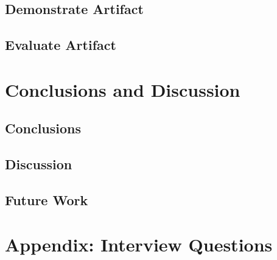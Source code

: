 \documentclass[12pt, a4, oneside, openright]{book}
\begin{document}
    \section{Demonstrate Artifact}
    \label{sec:demo}
    
    
    \section{Evaluate Artifact}
    \label{sec:evaluate}
      
    

    \chapter{Conclusions and Discussion}
    \label{chap:conclusions_discussion}
    
    \section{Conclusions}
    \label{sec:conclusions}
    
    
    \section{Discussion}
    \label{sec:discussion}
    
    
    \section{Future Work}
    \label{sec:future}
    

    \backmatter


%    
%    

%    
%    


    
    

    \appendix
    \chapter{Appendix: Interview Questions}
    \label{appendix:questions}
    

    \finalpageDSV

    
    
\end{document}
